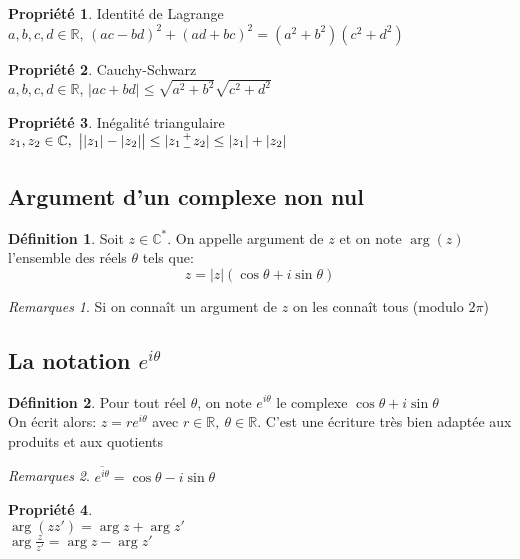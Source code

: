 \documentclass[fleqn]{article}
\theoremstyle{definition} \newtheorem*{defi}{D\'efinition}
\theoremstyle{definition} \newtheorem*{theo}{Th\'eor\`eme}
\theoremstyle{definition} \newtheorem*{coro}{Corollaire}
\theoremstyle{remark} \newtheorem*{rqs}{Remarques}
\theoremstyle{definition} \newtheorem*{prop}{Propri\'et\'e}
\newcommand*{\bfrac}[2]{\genfrac{}{}{0pt}{}{#1}{#2}}
\begin{document}
\begin{prop} Identit\'e de Lagrange \\
	$a,b,c,d \in \mathbb{R}$, $(ac - bd)^2 + (ad + bc)^2 = (a^2 + b^2)(c^2 + d^2)$
\end{prop}

\begin{prop} Cauchy-Schwarz \\
	$a,b,c,d \in \mathbb{R}$, $|ac + bd| \leq \sqrt{a^2 + b^2} \sqrt{c^2 + d^2}$
\end{prop}

\begin{prop} In\'egalit\'e triangulaire \\
	$z_1, z_2 \in \mathbb{C},\ \big||z_1| - |z_2|\big| \leq |z_1 \bfrac{+}{-} z_2| \leq |z_1| + |z_2|$
\end{prop}

\subsection{Argument d'un complexe non nul}
\begin{defi}
	Soit $z \in \mathbb{C}^*$. On appelle argument de $z$ et on note $\arg(z)$ l'ensemble des r\'eels $\theta$ tels que:
	\[z = |z|(\cos \theta + i \sin \theta)\]
	\begin{rqs}
		Si on conna\^it un argument de $z$ on les conna\^it tous (modulo $2\pi$)
	\end{rqs}
\end{defi}

\subsection{La notation $e^{i \theta}$}
\begin{defi}
	Pour tout r\'eel $\theta$, on note $e^{i\theta}$ le complexe $\cos \theta + i \sin \theta$\\
	On \'ecrit alors: $z = re^{i\theta}$ avec $r \in \mathbb{R},\ \theta \in \mathbb{R}$. C'est une \'ecriture tr\`es bien adapt\'ee aux produits
	et aux quotients
	\begin{rqs}
		$\overline{e^{i\theta}} = \cos \theta - i \sin \theta$
	\end{rqs}
\end{defi}
\begin{prop} $ $ \\
	$\arg (zz') = \arg z + \arg z'$\\
	$\arg \frac{z}{z'}  = \arg z  - \arg z'$
\end{prop}
\end{document}
